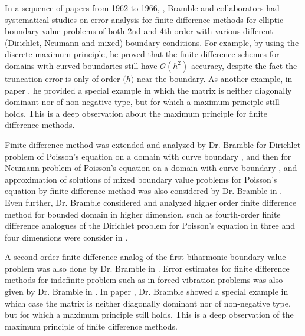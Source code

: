 \documentclass[CJK,11pt]{amsart}
\theoremstyle{definition}
\begin{document}
\begin{CJK*}{UTF8}{gbsn}
In a sequence of papers from 1962 to 1966,
\cite{bramble1962formulation, bramble1963fourth, bramble1964finite,
  bramble1965finite,bramble1965approximation,bramble1966second,bramble1966error},
Bramble and collaborators had systematical studies on error analysis
for finite difference methods for elliptic boundary value problems of
both 2nd and 4th order with various different (Dirichlet, Neumann and
mixed) boundary conditions.  For example, by using the discrete maximum
principle, he proved that the finite difference schemes for domains
with curved boundaries still have $\mathcal O(h^2)$ accuracy, despite the
fact the truncation error is only of order $\mathcal (h)$ near the
boundary.  As another example, in paper \cite{bramble1964finite}, he
provided a special example in which the matrix is neither
diagonally dominant nor of non-negative type, but for which a maximum
principle still holds. This is a deep observation about the maximum
principle for finite difference methods.

% 

Finite difference method was extended and analyzed by Dr. Bramble for Dirichlet problem of Poisson's equation on a domain with curve boundary \cite{bramble1962formulation}, and then  for Neumann problem of Poisson's 
equation on a domain with curve boundary \cite{bramble1965finite}, and approximation of solutions of mixed boundary value problems for Poisson's equation by finite difference method was also considered by Dr. Bramble in \cite{bramble1965approximation}.   Even further, Dr. Bramble considered and analyzed higher order finite difference method for bounded  domain in higher dimension, such as fourth-order finite difference analogues of the Dirichlet problem for Poisson's equation in three and four dimensions were consider in \cite{bramble1963fourth}. 

A second order finite difference analog of the first biharmonic boundary value problem was also done by Dr. Bramble in \cite{bramble1966second}. 
Error estimates for finite difference methods for indefinite problem such as in forced vibration problems was also given by Dr. Bramble in \cite{bramble1966error}. In paper \cite{bramble1964finite}, Dr. Bramble showed  a special example in which case the matrix is neither diagonally dominant nor of non-negative type, but for which a maximum principle still holds. This is a deep observation of the maximum principle of finite difference methods.  


\end{CJK*}
\end{document}
